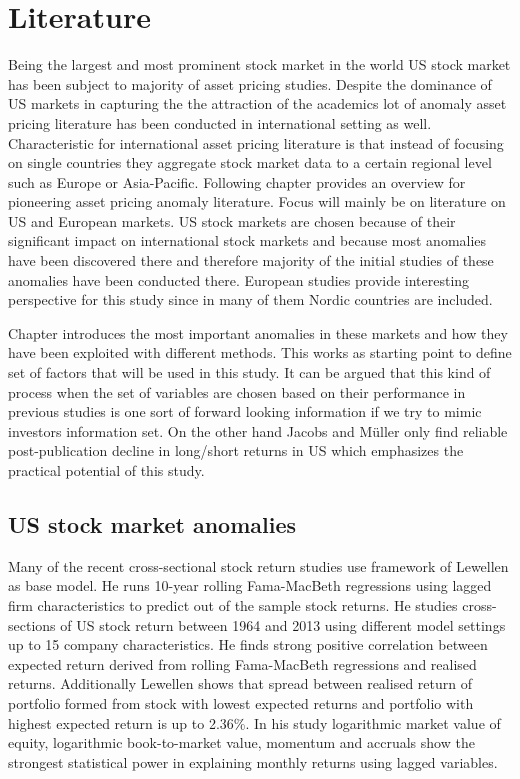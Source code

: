 \documentclass{article}
\begin{document}
\section{Literature}\label{Literature}
Being the largest and most prominent stock market in the world US stock market has been subject to majority of asset pricing studies. Despite the dominance of US markets in capturing the the attraction of the academics lot of anomaly asset pricing literature has been conducted in international setting as well. Characteristic for international asset pricing literature is that instead of focusing on single countries they aggregate stock market data to a certain regional level such as Europe or Asia-Pacific. Following chapter provides an overview for pioneering asset pricing anomaly literature. Focus will mainly be on literature on US and European markets. US stock markets are chosen because of their significant impact on international stock markets and because most anomalies have been discovered there and therefore majority of the initial studies of these anomalies have been conducted there. European studies provide interesting perspective for this study since in many of them Nordic countries are included. \par

Chapter introduces the most important anomalies in these markets and how they have been exploited with different methods. This works as starting point to define set of factors that will be used in this study. It can be argued that this kind of process when the set of variables are chosen based on their performance in previous studies is one sort of forward looking information if we try to mimic investors information set. On the other hand Jacobs and Müller \citeyear{JACOBS2020213} only find reliable post-publication decline in long/short returns in US which emphasizes the practical potential of this study. \par

\subsection{US stock market anomalies}\label{USStockMarketAnomalies}

Many of the recent cross-sectional stock return studies use framework of Lewellen \citeyear{Lewellen2015} as base model. He runs 10-year rolling Fama-MacBeth regressions using lagged firm characteristics to predict out of the sample stock returns. He studies cross-sections of US stock return between 1964 and 2013 using different model settings up to 15 company characteristics. He finds strong positive correlation between expected return derived from rolling Fama-MacBeth regressions and realised returns. Additionally Lewellen shows that spread between realised return of portfolio formed from stock with lowest expected returns and portfolio with highest expected return is up to 2.36\%. In his study logarithmic market value of equity, logarithmic book-to-market value, momentum and accruals show the strongest statistical power in explaining monthly returns using lagged variables. \par
\end{document}
